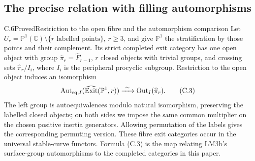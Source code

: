 \subsection{The precise relation with filling automorphisms}

\begin{result}{C.6}{Proved}{Restriction to the open fibre and the automorphism comparison}
Let $U_r=\mathbb P^1(\mathbb C)\setminus\{r\text{ labelled points}\}$, $r\geq3$, and give $\mathbb P^1$ the stratification by those points and their complement. Its strict completed exit category has one open object with group $\widehat\pi_r=\widehat F_{r-1}$, $r$ closed objects with trivial groups, and crossing sets $\widehat\pi_r/I_i$, where $I_i$ is the peripheral procyclic subgroup. Restriction to the open object induces an isomorphism
\[
 \operatorname{Aut}_{\mathrm{eq},I}(\widehat{\operatorname{Exit}}(\mathbb P^1,r))
 \xrightarrow{\ \sim\ }
 \operatorname{Out}_I(\widehat\pi_r).                                    \tag{C.3}
\]
The left group is autoequivalences modulo natural isomorphism, preserving the labelled closed objects; on both sides we impose the same common multiplier on the chosen positive inertia generators. Allowing permutation of the labels gives the corresponding permuting version. These fibre exit categories occur in the universal stable-curve functors. Formula (C.3) is the map relating LM3b's surface-group automorphisms to the completed categories in this paper.
\end{result}

